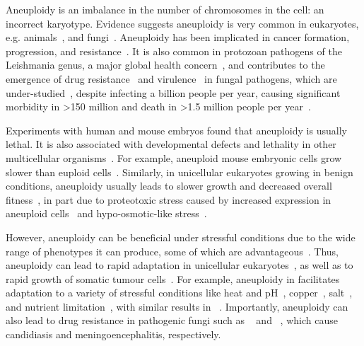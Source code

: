 \documentclass[12pt]{extarticle}
\begin{document}
Aneuploidy is an imbalance in the number of chromosomes in the cell: an incorrect karyotype.
Evidence suggests aneuploidy is very common in eukaryotes, e.g. animals~\citep{Santaguida2015review, Naylor2016, Bakhoum2017}, and fungi~\citep{Pavelka2010, Zhu2016, Robbins2017, Todd2017}.
Aneuploidy has been implicated in cancer formation, progression, and resistance~\citep{Boveri2008, Schvartzman2010, Santaguida2015review, Ippolito2021b}.
It is also common in protozoan pathogens of the Leishmania genus, a major global health concern~\citep{Mannaert2012}, and contributes to the emergence of drug resistance~\citep{Selmecki2009} and virulence~\citep{Moller2018} in fungal pathogens, which are under-studied~\citep{Rodrigues2018}, despite infecting a billion people per year, causing significant morbidity in >150 million and death in >1.5 million people per year~\citep{Selmecki2009, Rodrigues2018}.

Experiments with human and mouse embryos found that aneuploidy is usually lethal.
It is also associated with developmental defects and lethality in other multicellular organisms~\citep{Sheltzer2011}. For example, aneuploid mouse embryonic cells grow slower than euploid cells~\citep{Williams2008}.
Similarly, in unicellular eukaryotes growing in benign conditions, aneuploidy usually leads to slower growth and decreased overall fitness~\citep{Niwa2006, Torres2007, Pavelka2010, Sheltzer2011, Kasuga2016, Yang2021}, in part due to proteotoxic stress caused by increased expression in aneuploid cells~\citep{Pavelka2010, Santaguida2015, Zhu2018} and hypo-osmotic-like stress~\citep{Tsai2019}.

However, aneuploidy can be beneficial under stressful conditions due to the wide range of phenotypes it can produce, some of which are advantageous~\citep{Pavelka2010, Yang2021}.
Thus, aneuploidy can lead to rapid adaptation in unicellular eukaryotes~\citep{Gerstein2015,Torres2010, Hong2014, Rancati2008}, as well as to rapid growth of somatic tumour cells~\citep{Schvartzman2010, Sheltzer2017}.
For example, aneuploidy in \yeast facilitates adaptation to a variety of stressful conditions like heat and pH~\citep{Yona2012}, copper~\citep{Covo2014, Gerstein2015}, salt~\citep{Dhar2011}, and nutrient limitation~\citep{Dunham2002, Gresham2008, Avecilla2022}, with similar results in \calbicans~\citep{Yang2021}.
Importantly, aneuploidy can also lead to drug resistance in pathogenic fungi such as \calbicans~\citep{Selmecki2008, Selmecki2010, Gerstein2018} and \cneoformans~\citep{Sionov2010}, which cause candidiasis and meningoencephalitis, respectively.
\end{document}
